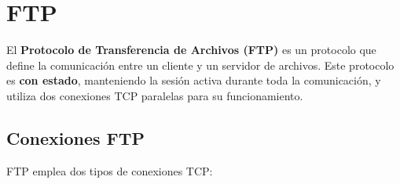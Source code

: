 \documentclass{article}
\begin{document}
\newpage

\section{FTP}

El 	\textbf{Protocolo de Transferencia de Archivos (FTP)} es un protocolo que define la comunicación entre un cliente y un servidor de archivos. Este protocolo es 	\textbf{con estado}, manteniendo la sesión activa durante toda la comunicación, y utiliza dos conexiones TCP paralelas para su funcionamiento. 

\subsection{Conexiones FTP}

FTP emplea dos tipos de conexiones TCP:
\end{document}
